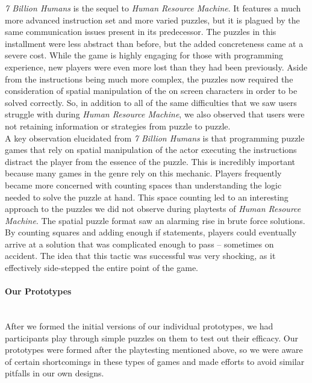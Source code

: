 \textit{7 Billion Humans} is the sequel to \textit{Human Resource Machine}.  It features a much more advanced instruction set and more varied puzzles, but it is plagued by the same communication issues present in its predecessor. The puzzles in this installment were less abstract than before, but the added concreteness came at a severe cost. While the game is highly engaging for those with programming experience, new players were even more lost than they had been previously. Aside from the instructions being much more complex, the puzzles now required the consideration of spatial manipulation of the on screen characters in order to be solved correctly. So, in addition to all of the same difficulties that we saw users struggle with during \textit{Human Resource Machine}, we also observed that users were not retaining information or strategies from puzzle to puzzle.\\

A key observation elucidated from \textit{7 Billion Humans} is that programming puzzle games that rely on spatial manipulation of the actor executing the instructions distract the player from the essence of the puzzle. This is incredibly important because many games in the genre rely on this mechanic. Players frequently became more concerned with counting spaces than understanding the logic needed to solve the puzzle at hand. This space counting led to an interesting approach to the puzzles we did not observe during playtests of \textit{Human Resource Machine}. The spatial puzzle format saw an alarming rise in brute force solutions. By counting squares and adding enough if statements, players could eventually arrive at a solution that was complicated enough to pass -- sometimes on accident. The idea that this tactic was successful was very shocking, as it effectively side-stepped the entire point of the game.\\

\paragraph{Our Prototypes}\mbox{} \\
After we formed the initial versions of our individual prototypes, we had participants play through simple puzzles on them to test out their efficacy. Our prototypes were formed after the playtesting mentioned above, so we were aware of certain shortcomings in these types of games and made efforts to avoid similar pitfalls in our own designs.\\

